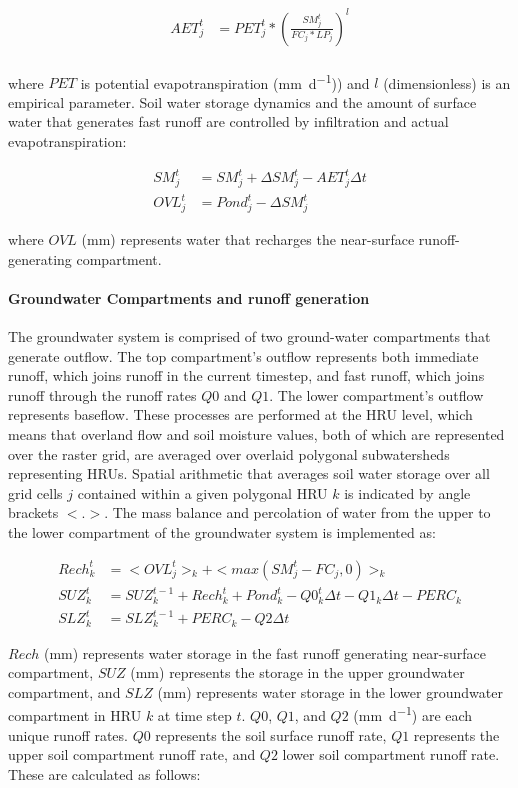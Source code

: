 \begin{align}
AET_j^t &= PET_j^t * \left(\frac{SM_j^t}{FC_j * LP_j} \right)^l  \\
\end{align}

\noindent where $PET$ is potential evapotranspiration (\si{\milli\metre\per\day})) and $l$ (dimensionless) is an empirical  parameter. Soil water storage dynamics and the amount of surface water that generates fast runoff are controlled by infiltration and actual evapotranspiration:

\begin{align}
SM_j^t &= SM_j^{t} + \Delta SM_j^t - AET_j^t \Delta t\\
OVL_j^t &= Pond_j^t - \Delta SM_j^t
\end{align}

\noindent where $OVL$ (\si{\milli\metre}) represents water that recharges the near-surface runoff-generating compartment.

\paragraph{Groundwater Compartments and runoff generation}
The groundwater system is comprised of two ground-water compartments that generate outflow. The top compartment's outflow represents both immediate runoff, which joins runoff in the current timestep, and fast runoff, which joins runoff through the runoff rates $Q0$ and $Q1$. The lower compartment's outflow represents baseflow. These processes are performed at the HRU level, which means that overland flow and soil moisture values, both of which are represented over the raster grid, are averaged over overlaid polygonal subwatersheds representing HRUs. Spatial arithmetic that averages soil water storage over all grid cells $j$ contained within a given polygonal HRU $k$ is indicated by angle brackets $<.>$. The mass balance and percolation of water from the upper to the lower compartment of the groundwater system is implemented as:

\begin{align}
Rech_k^t &= <OVL_j^t>_k + <max(SM_j^t - FC_j, 0)>_k\\
SUZ_k^t &= SUZ_k^{t-1} + Rech_k^t + Pond_k^t - Q0_k^t\Delta t - Q1_k\Delta t - PERC_k\\
SLZ_k^t &= SLZ_k^{t-1} + PERC_k - Q2 \Delta t
\end{align}

\noindent $Rech$ (\si{\milli\meter}) represents water storage in the fast runoff generating near-surface compartment, $SUZ$ (\si{\milli\meter}) represents the storage in the upper groundwater compartment, and $SLZ$ (\si{\milli\meter}) represents water storage in the lower groundwater compartment in HRU $k$ at time step $t$. $Q0$, $Q1$, and $Q2$ (\si{\milli\meter\per\day}) are each unique runoff rates. $Q0$ represents the soil surface runoff rate, $Q1$ represents the upper soil compartment runoff rate, and $Q2$ lower soil compartment runoff rate. These are calculated as follows:

